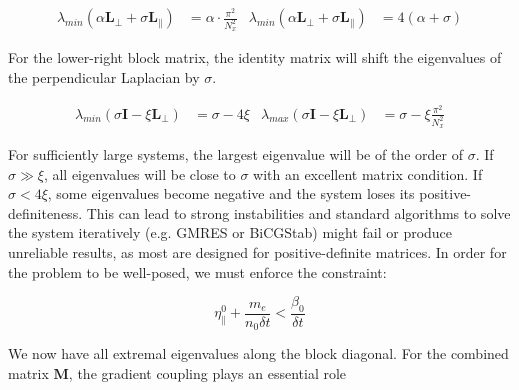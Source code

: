 \begin{align}
	\lambda_{min}(\alpha \textbf{L}_\perp + \sigma \textbf{L}_\parallel) &= \alpha\cdot\frac{\pi^2}{N_x^2} & \lambda_{min}(\alpha \textbf{L}_\perp + \sigma \textbf{L}_\parallel) &= 4(\alpha + \sigma)
\end{align}

For the lower-right block matrix, the identity matrix will shift the eigenvalues of the perpendicular Laplacian by $\sigma$. 

\begin{align}
	\lambda_{min}(\sigma \textbf{I} - \xi \textbf{L}_\perp) &= \sigma - 4\xi & \lambda_{max}(\sigma \textbf{I} - \xi \textbf{L}_\perp) &= \sigma - \xi\frac{\pi^2}{N_x^2}
\end{align}

For sufficiently large systems, the largest eigenvalue will be of the order of $\sigma$. If $\sigma \gg \xi$, all eigenvalues will be close to $\sigma$ with an excellent matrix condition. If $\sigma < 4\xi$, some eigenvalues become negative and the system loses its positive-definiteness. This can lead to strong instabilities and standard algorithms to solve the system iteratively (e.g. GMRES or BiCGStab) might fail or produce unreliable results, as most are designed for positive-definite matrices. In order for the problem to be well-posed, we must enforce the constraint:

\begin{equation}
	\label{eq:Impl_conditionPositiveDefinite}
	\eta_\parallel^0 + \frac{m_e}{n_0 \delta t} < \frac{\beta_0}{\delta t}
\end{equation}

We now have all extremal eigenvalues along the block diagonal. For the combined matrix $\mathbf{M}$, the gradient coupling plays an essential role 


